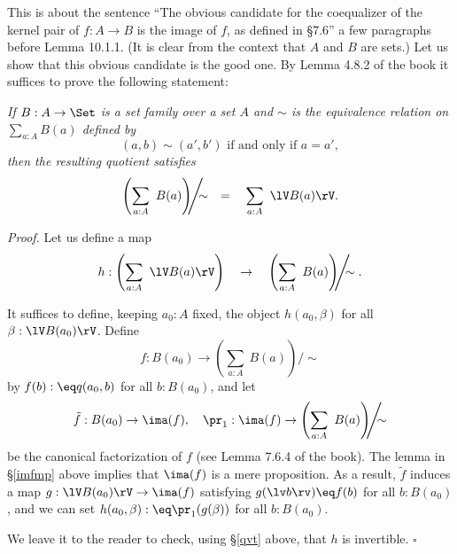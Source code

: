 \documentclass[12pt]{article}
\begin{document}
This is about the sentence ``The obvious candidate for the coequalizer of the kernel pair of $f:A\to B$ is the image of $f$, as defined in \S7.6'' a few paragraphs before Lemma 10.1.1. (It is clear from the context that $A$ and $B$ are sets.) Let us show that this obvious candidate is the good one. By Lemma 4.8.2 of the book it suffices to prove the following statement:

\emph{If $B:A\to\Set$ is a set family over a set $A$ and $\sim$ is the equivalence relation on $\sum_{a:A}B(a)$ defined by 
$$
(a,b)\sim(a',b')\text{ if and only if }a=a',
$$ 
then the resulting quotient satisfies}
$$
\left(\sum_{a:A}\ B(a)\right)\!\!\!\Bigg/\!\!\!\!\sim\quad=\quad\sum_{a:A}\ \lV B(a)\rV.
$$

\nn\emph{Proof.} Let us define a map 
$$
h:\left(\sum_{a:A}\ \lV B(a)\rV\right)\quad\to\quad\left(\sum_{a:A}\ B(a)\right)\!\!\!\Bigg/\!\!\!\!\sim.
$$ 

It suffices to define, keeping $a_0:A$ fixed, the object $h(a_0,\beta)$ for all $\beta:\lV B(a_0)\rV$. Define 
$$
f:B(a_0)\to\left(\sum_{a:A}\ B(a)\right)\!\!\!\Bigg/\!\!\!\!\sim
$$ 
by $f(b):\eq q(a_0,b)$ for all $b:B(a_0)$, and let 
$$
\tilde f:B(a_0)\to\ima(f),\quad\pr_1:\ima(f)\to\left(\sum_{a:A}\ B(a)\right)\!\!\!\Bigg/\!\!\!\!\sim
$$ 
be the canonical factorization of $f$ (see Lemma 7.6.4 of the book). The lemma in \S\ref{imfmp} above implies that $\ima(f)$ is a mere proposition. As a result, $\tilde f$ induces a map $g:\lV B(a_0)\rV\to\ima(f)$ satisfying $g(\lv b\rv)\eq f(b)$ for all $b:B(a_0)$, and we can set $h(a_0,\beta):\eq\pr_1(g(\beta))$ for all $b:B(a_0)$.

We leave it to the reader to check, using \S\ref{qvt} above, that $h$ is invertible. $\square$
\end{document}
